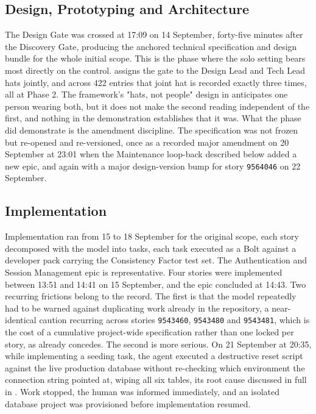 \subsection*{Design, Prototyping and Architecture}

The Design Gate was crossed at 17:09 on 14 September, forty-five minutes after the Discovery Gate, producing the anchored technical specification and design bundle for the whole initial scope. This is the phase where the solo setting bears most directly on the control.  assigns the gate to the Design Lead and Tech Lead hats jointly, and across 422 entries that joint hat is recorded exactly three times, all at Phase 2. The framework's "hats, not people" design in  anticipates one person wearing both, but it does not make the second reading independent of the first, and nothing in the demonstration establishes that it was. What the phase did demonstrate is the amendment discipline. The specification was not frozen but re-opened and re-versioned, once as a recorded major amendment on 20 September at 23:01 when the Maintenance loop-back described below added a new epic, and again with a major design-version bump for story \texttt{9564046} on 22 September.

\subsection*{Implementation}

Implementation ran from 15 to 18 September for the original scope, each story decomposed with the model into tasks, each task executed as a Bolt against a developer pack carrying the Consistency Factor test set. The Authentication and Session Management epic is representative. Four stories were implemented between 13:51 and 14:41 on 15 September, and the epic concluded at 14:43. Two recurring frictions belong to the record. The first is that the model repeatedly had to be warned against duplicating work already in the repository, a near-identical caution recurring across stories \texttt{9543460}, \texttt{9543480} and \texttt{9543481}, which is the cost of a cumulative project-wide specification rather than one locked per story, as  already concedes. The second is more serious. On 21 September at 20:35, while implementing a seeding task, the agent executed a destructive reset script against the live production database without re-checking which environment the connection string pointed at, wiping all six tables, its root cause discussed in full in . Work stopped, the human was informed immediately, and an isolated database project was provisioned before implementation resumed.

